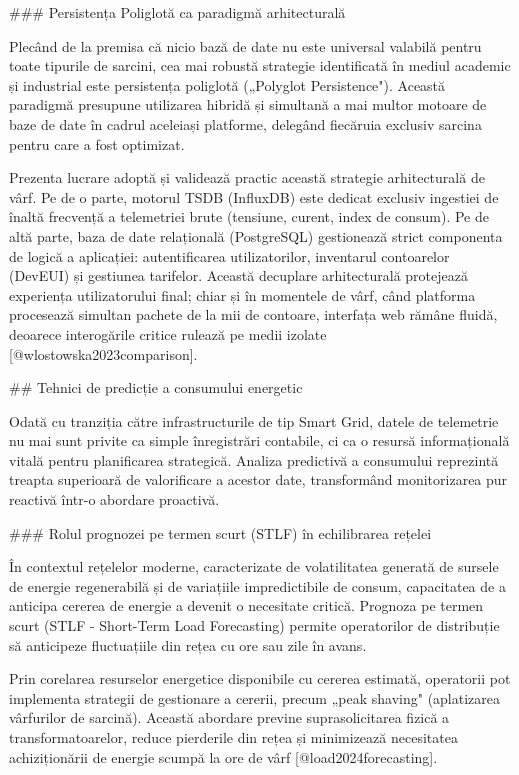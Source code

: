 ### Persistența Poliglotă ca paradigmă arhitecturală

Plecând de la premisa că nicio bază de date nu este universal valabilă
pentru toate tipurile de sarcini, cea mai robustă strategie identificată
în mediul academic și industrial este persistența poliglotă („Polyglot
Persistence"). Această paradigmă presupune utilizarea hibridă și
simultană a mai multor motoare de baze de date în cadrul aceleiași
platforme, delegând fiecăruia exclusiv sarcina pentru care a fost
optimizat.

Prezenta lucrare adoptă și validează practic această strategie
arhitecturală de vârf. Pe de o parte, motorul TSDB (InfluxDB) este
dedicat exclusiv ingestiei de înaltă frecvență a telemetriei brute
(tensiune, curent, index de consum). Pe de altă parte, baza de date
relațională (PostgreSQL) gestionează strict componenta de logică a
aplicației: autentificarea utilizatorilor, inventarul contoarelor
(DevEUI) și gestiunea tarifelor. Această decuplare arhitecturală
protejează experiența utilizatorului final; chiar și în momentele de
vârf, când platforma procesează simultan pachete de la mii de contoare,
interfața web rămâne fluidă, deoarece interogările critice rulează pe
medii izolate [@wlostowska2023comparison].

## Tehnici de predicție a consumului energetic

Odată cu tranziția către infrastructurile de tip Smart Grid, datele de
telemetrie nu mai sunt privite ca simple înregistrări contabile, ci ca o
resursă informațională vitală pentru planificarea strategică. Analiza
predictivă a consumului reprezintă treapta superioară de valorificare a
acestor date, transformând monitorizarea pur reactivă într-o abordare
proactivă.

### Rolul prognozei pe termen scurt (STLF) în echilibrarea rețelei

În contextul rețelelor moderne, caracterizate de volatilitatea generată
de sursele de energie regenerabilă și de variațiile impredictibile de
consum, capacitatea de a anticipa cererea de energie a devenit o
necesitate critică. Prognoza pe termen scurt (STLF - Short-Term Load
Forecasting) permite operatorilor de distribuție să anticipeze
fluctuațiile din rețea cu ore sau zile în avans.

Prin corelarea resurselor energetice disponibile cu cererea estimată,
operatorii pot implementa strategii de gestionare a cererii, precum
„peak shaving" (aplatizarea vârfurilor de sarcină). Această abordare
previne suprasolicitarea fizică a transformatoarelor, reduce pierderile
din rețea și minimizează necesitatea achiziționării de energie scumpă la
ore de vârf [@load2024forecasting].

